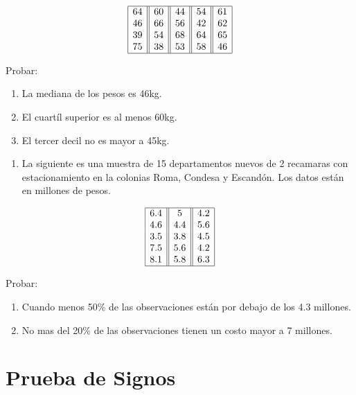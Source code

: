 \documentclass[
  a4paper,
  oneside,
  openany]{book}
\providecommand{\tightlist}{%
  \setlength{\itemsep}{0pt}\setlength{\parskip}{0pt}}
\begin{document}
\[
\begin{array}{|c| |c| |c| |c| |c|} 
\hline
64& 60& 44& 54& 61\\
46& 66& 56& 42& 62\\
39& 54& 68& 64& 65\\
75& 38& 53& 58&46\\
\hline
\end{array}
\]

Probar:

\begin{enumerate}
\def\labelenumi{\alph{enumi})}
\item
  La mediana de los pesos es 46kg.
\item
  El cuartíl superior es al menos 60kg.
\item
  El tercer decil no es mayor a 45kg.
\end{enumerate}

\begin{enumerate}
\def\labelenumi{\arabic{enumi}.}
\setcounter{enumi}{1}
\tightlist
\item
  La siguiente es una muestra de 15 departamentos nuevos de 2 recamaras con estacionamiento en la colonias Roma, Condesa y Escandón. Los datos están en millones de pesos.
\end{enumerate}

\[
\begin{array}{|c| |c| |c|} 
\hline
6.4&    5&  4.2\\
4.6&    4.4&    5.6\\
3.5&    3.8&    4.5\\
7.5&    5.6&    4.2\\
8.1&    5.8&    6.3\\
\hline
\end{array}
\]

Probar:

\begin{enumerate}
\def\labelenumi{\alph{enumi})}
\item
  Cuando menos 50\% de las observaciones están por debajo de los 4.3 millones.
\item
  No mas del 20\% de las observaciones tienen un costo mayor a 7 millones.
\end{enumerate}

\hypertarget{prueba-de-signos}{%
\chapter{Prueba de Signos}\label{prueba-de-signos}}
\end{document}

